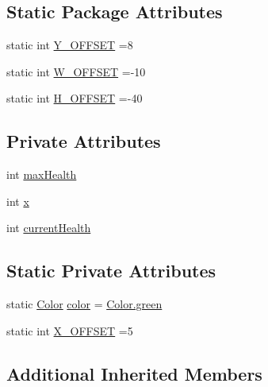 \subsection*{Static Package Attributes}
\begin{DoxyCompactItemize}
\item 
static int \mbox{\hyperlink{classgui_1_1_health_bar_a2dca8e9cc5a4b5e8276a729e95fad3a8}{Y\+\_\+\+O\+F\+F\+S\+ET}} =8
\item 
static int \mbox{\hyperlink{classgui_1_1_health_bar_ac1a7ff0a3f9b52d9217d92cfd0900dba}{W\+\_\+\+O\+F\+F\+S\+ET}} =-\/10
\item 
static int \mbox{\hyperlink{classgui_1_1_health_bar_a8493ff991be356585d90e42ee6e343c6}{H\+\_\+\+O\+F\+F\+S\+ET}} =-\/40
\end{DoxyCompactItemize}
\subsection*{Private Attributes}
\begin{DoxyCompactItemize}
\item 
int \mbox{\hyperlink{classgui_1_1_health_bar_a140d4fec43b960a1ba75f3e767501e6f}{max\+Health}}
\item 
int \mbox{\hyperlink{classgui_1_1_health_bar_a8895162adfc4ba2fc6d4b324b8460d20}{x}}
\item 
int \mbox{\hyperlink{classgui_1_1_health_bar_a598c9b29bf24fe830bff5d1ea2707b02}{current\+Health}}
\end{DoxyCompactItemize}
\subsection*{Static Private Attributes}
\begin{DoxyCompactItemize}
\item 
static \mbox{\hyperlink{classorg_1_1newdawn_1_1slick_1_1_color}{Color}} \mbox{\hyperlink{classgui_1_1_health_bar_a7e50fd09de837bf25afb6a238fd3e465}{color}} = \mbox{\hyperlink{classorg_1_1newdawn_1_1slick_1_1_color_a1cd4406bbd518aeb8baefcf19df24424}{Color.\+green}}
\item 
static int \mbox{\hyperlink{classgui_1_1_health_bar_a91e3f1b53b5b3016af07ae8e08c3f38a}{X\+\_\+\+O\+F\+F\+S\+ET}} =5
\end{DoxyCompactItemize}
\subsection*{Additional Inherited Members}


